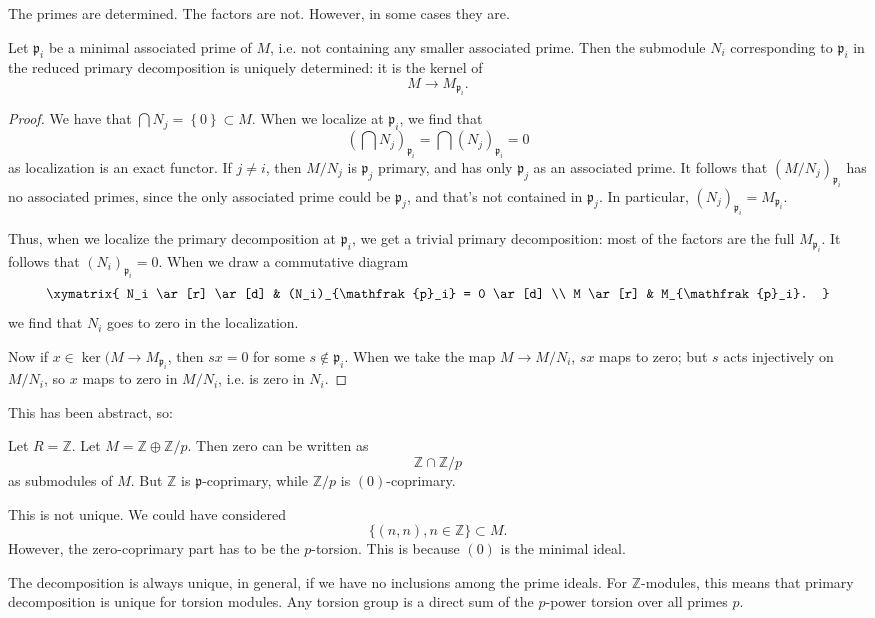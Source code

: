 The primes are determined. The factors are not. However, in some cases they are.

\begin{proposition} 
Let $\mathfrak{p}_i$ be a minimal associated prime of $M$, i.e. not containing
any smaller associated prime. Then the submodule $N_i$  corresponding to
$\mathfrak{p}_i$ in the reduced primary decomposition is uniquely determined:
it is the kernel of 
\[ M \to M_{\mathfrak{p}_i}.  \]
\end{proposition} 

\begin{proof} 
We have that $\bigcap N_j = \left\{0\right\} \subset M$. When we localize at
$\mathfrak{p}_i$, we find that
\[ (\bigcap N_j)_{\mathfrak{p}_i} = \bigcap (N_j)_{\mathfrak{p}_i} =0 \]
as localization is an exact functor. If $j \neq i$, then $M/N_j$ is
$\mathfrak{p}_j$ primary, and has only $\mathfrak{p}_j$ as an associated prime.
It follows that $(M/N_j)_{\mathfrak{p}_i}$ has no associated primes, since the
only associated prime could be $\mathfrak{p}_j$, and that's not contained in
$\mathfrak{p}_j$.
In particular, $(N_j)_{\mathfrak{p}_i} = M_{\mathfrak{p}_i}$.

Thus, when we localize the primary decomposition at $\mathfrak{p}_i$, we get
a trivial primary decomposition: most of the factors are the full
$M_{\mathfrak{p}_i}$.  It follows that $(N_i)_{\mathfrak{p}_i}=0$. When we draw
a commutative diagram
\[ 
\xymatrix{
N_i \ar[r] \ar[d]  &  (N_i)_{\mathfrak{p}_i} = 0 \ar[d]  \\
M \ar[r] &  M_{\mathfrak{p}_i}.
}
\]
we find that $N_i$ goes to zero in the localization.

Now if $x \in \ker(M \to M_{\mathfrak{p}_i}$, then $sx = 0$ for some $s \notin
\mathfrak{p}_i$. When we take the map $M \to M/N_i$, $sx$ maps to zero; but $s$
acts injectively on $M/N_i$, so $x$ maps to zero in $M/N_i$, i.e. is zero in
$N_i$.
\end{proof} 

This has been abstract, so:
\begin{example} Let $ R = \mathbb{Z}$.
Let $M = \mathbb{Z} \oplus \mathbb{Z}/p$. Then zero can be written as 
\[ \mathbb{Z} \cap \mathbb{Z}/p  \]
as submodules of $M$. But $\mathbb{Z}$ is $\mathfrak{p}$-coprimary, while
$\mathbb{Z}/p$ is $(0)$-coprimary. 

This is not unique. We could have considered 
\[ \{(n,n), n \in \mathbb{Z}\} \subset M.  \]
However, the zero-coprimary part has to be the $p$-torsion. This is because
$(0)$ is the minimal ideal. 

The decomposition is always unique, in general, if
we have no inclusions among the prime ideals. For $\mathbb{Z}$-modules, this
means that primary decomposition is unique for torsion modules. 
Any torsion group is a direct sum of the $p$-power torsion over all primes $p$. 
\end{example} 

